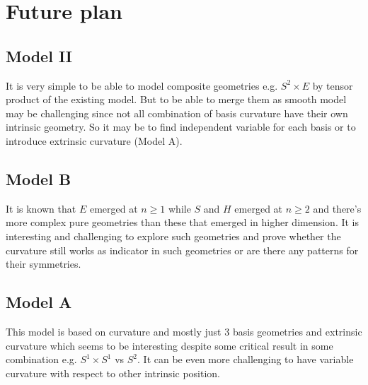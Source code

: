 \documentclass[stu, babel, american, biblatex, a4paper, draftall]{apa7}
\begin{document}
\section{Future plan}
\subsection{Model II}
It is very simple to be able to model composite geometries e.g. $S^2 \times E$ by tensor product of the existing model. But to be able to merge them as smooth model may be challenging since not all combination of basis curvature have their own intrinsic geometry. So it may be to find independent variable for each basis or to introduce extrinsic curvature (Model A).
\subsection{Model B}
It is known that $E$ emerged at $n\ge1$ while $S$ and $H$ emerged at $n\ge2$ and there's more complex pure geometries than these that emerged in higher dimension. It is interesting and challenging to explore such geometries and prove whether the curvature still works as indicator in such geometries or are there any patterns for their symmetries.
\subsection{Model A}
This model is based on curvature and mostly just 3 basis geometries and extrinsic curvature which seems to be interesting despite some critical result in some combination e.g. $S^1 \times S^1$ vs $S^2$. It can be even more challenging to have variable curvature with respect to other intrinsic position.
\section*{}
\printbibliography
\end{document}
